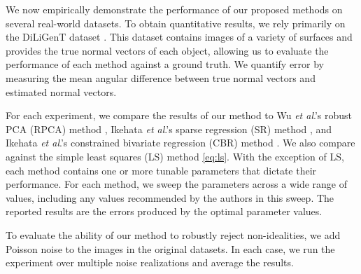 
We now empirically demonstrate the performance of our proposed methods on several real-world datasets. To obtain quantitative results, we rely primarily on the DiLiGenT dataset \cite{shi2016}. This dataset contains images of a variety of surfaces and provides the true normal vectors of each object, allowing us to evaluate the performance of each method against a ground truth. We quantify error by measuring the mean angular difference between true normal vectors and estimated normal vectors. 

For each experiment, we compare the results of our method to Wu \textit{et al}.'s robust PCA (RPCA) method \cite{wu2011}, Ikehata \textit{et al}.'s sparse regression (SR) method \cite{ikehata2012}, and Ikehata \textit{et al}.'s constrained bivariate regression (CBR) method \cite{ikehata2014}. We also compare against the simple least squares (LS) method \eqref{eq:ls}. With the exception of LS, each method contains one or more tunable parameters that dictate their performance. For each method, we sweep the parameters across a wide range of values, including any values recommended by the authors in this sweep. The reported results are the errors produced by the optimal parameter values.

To evaluate the ability of our method to robustly reject non-idealities, we add Poisson noise to the images in the original datasets. In each case, we run the experiment over multiple noise realizations and average the results.

